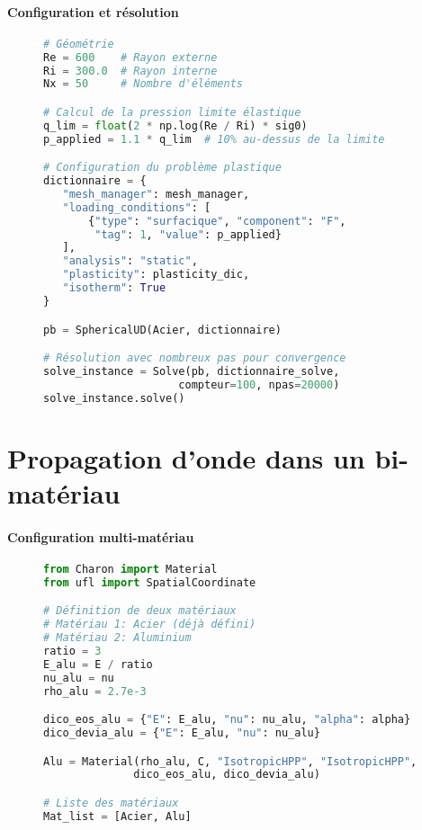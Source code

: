 \documentclass[10pt]{book}
\begin{document}
\paragraph{Configuration et résolution}

\begin{figure}[h!]
\begin{lstlisting}[language=python]
# Géométrie
Re = 600    # Rayon externe
Ri = 300.0  # Rayon interne
Nx = 50     # Nombre d'éléments

# Calcul de la pression limite élastique
q_lim = float(2 * np.log(Re / Ri) * sig0)
p_applied = 1.1 * q_lim  # 10% au-dessus de la limite

# Configuration du problème plastique
dictionnaire = {
   "mesh_manager": mesh_manager,
   "loading_conditions": [
       {"type": "surfacique", "component": "F", 
        "tag": 1, "value": p_applied}
   ],
   "analysis": "static",
   "plasticity": plasticity_dic,
   "isotherm": True
}

pb = SphericalUD(Acier, dictionnaire)

# Résolution avec nombreux pas pour convergence
solve_instance = Solve(pb, dictionnaire_solve, 
                     compteur=100, npas=20000)
solve_instance.solve()
\end{lstlisting}
\end{figure}

\clearpage

\section{Propagation d'onde dans un bi-matériau}\label{Section:Propagation d'onde dans un bi-matériau}

\paragraph{Configuration multi-matériau}

\begin{figure}[h!]
\begin{lstlisting}[language=python]
from Charon import Material
from ufl import SpatialCoordinate

# Définition de deux matériaux
# Matériau 1: Acier (déjà défini)
# Matériau 2: Aluminium
ratio = 3
E_alu = E / ratio
nu_alu = nu
rho_alu = 2.7e-3

dico_eos_alu = {"E": E_alu, "nu": nu_alu, "alpha": alpha}
dico_devia_alu = {"E": E_alu, "nu": nu_alu}

Alu = Material(rho_alu, C, "IsotropicHPP", "IsotropicHPP", 
              dico_eos_alu, dico_devia_alu)

# Liste des matériaux
Mat_list = [Acier, Alu]
\end{lstlisting}
\end{figure}
\end{document}
